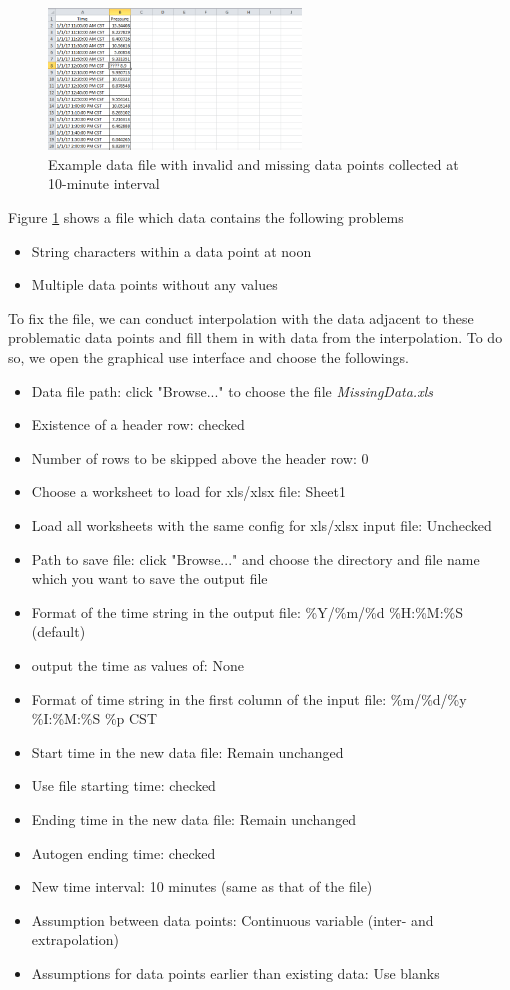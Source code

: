 \documentclass[12pt,a4paper]{article}
\begin{document}
\begin{figure}[H]
\centering
\includegraphics[width=0.6\textwidth]{missing_data.png}
\caption{Example data file with invalid and missing data points collected at 10-minute interval}
\label{fig:missing_data}
\end{figure}

Figure \ref{fig:missing_data} shows a file which data contains the following problems
\begin{itemize}
\item String characters within a data point at noon
\item Multiple data points without any values
\end{itemize}

To fix the file, we can conduct interpolation with the data adjacent to these problematic data points and fill them in with data from the interpolation.
To do so, we open the graphical use interface and choose the followings.
\begin{itemize}
\item Data file path: click "Browse..." to choose the file \emph{MissingData.xls}
\item Existence of a header row: checked
\item Number of rows to be skipped above the header row: 0
\item Choose a worksheet to load for xls/xlsx file: Sheet1
\item Load all worksheets with the same config for xls/xlsx input file: Unchecked
\item Path to save file: click "Browse..." and choose the directory and file name which you want to save the output file
\item Format of the time string in the output file: \%Y/\%m/\%d \%H:\%M:\%S (default)
\item output the time as values of: None
\item Format of time string in the first column of the input file: \%m/\%d/\%y \%I:\%M:\%S \%p CST
\item Start time in the new data file: Remain unchanged
\item Use file starting time: checked
\item Ending time in the new data file: Remain unchanged
\item Autogen ending time: checked
\item New time interval: 10 minutes (same as that of the file)
\item Assumption between data points: Continuous variable (inter- and extrapolation)
\item Assumptions for data points earlier than existing data: Use blanks
\end{itemize}
\end{document}
